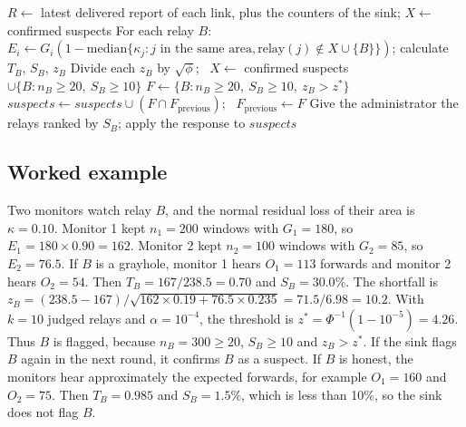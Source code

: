 \documentclass[11pt]{article}
\begin{document}
\begin{algorithm}[H]
\caption{Decision at the sink, every 30 minutes}\label{alg:sink}
\footnotesize
\begin{algorithmic}[1]
\State $R \gets$ latest delivered report of each link, plus the counters of the sink; $X \gets$ confirmed suspects
\Repeat {}
  \State For each relay $B$: $E_i \gets G_i(1-\mathrm{median}\{\kappa_j : j \text{ in the same area}, \mathrm{relay}(j) \notin X \cup \{B\}\})$; calculate $T_B$, $S_B$, $z_B$
  \State Divide each $z_B$ by $\sqrt{\phi}$; \ $X \gets$ confirmed suspects $\cup \{B : n_B \geq 20,\ S_B \geq 10\}$
\State $F \gets \{B : n_B \geq 20,\ S_B \geq 10,\ z_B > z^*\}$
\State $\mathit{suspects} \gets \mathit{suspects} \cup (F \cap F_{\mathrm{previous}})$; \ $F_{\mathrm{previous}} \gets F$
\State Give the administrator the relays ranked by $S_B$; apply the response to $\mathit{suspects}$
\end{algorithmic}
\end{algorithm}

\subsection{Worked example}\label{sec:prop-example}
\noindent
Two monitors watch relay $B$, and the normal residual loss of their area is $\kappa = 0.10$.
Monitor 1 kept $n_1 = 200$ windows with $G_1 = 180$, so $E_1 = 180 \times 0.90 = 162$.
Monitor 2 kept $n_2 = 100$ windows with $G_2 = 85$, so $E_2 = 76.5$.
If $B$ is a grayhole, monitor 1 hears $O_1 = 113$ forwards and monitor 2 hears $O_2 = 54$.
Then $T_B = 167/238.5 = 0.70$ and $S_B = 30.0\%$.
The shortfall is $z_B = (238.5 - 167)/\sqrt{162 \times 0.19 + 76.5 \times 0.235} = 71.5/6.98 = 10.2$.
With $k = 10$ judged relays and $\alpha = 10^{-4}$, the threshold is $z^* = \Phi^{-1}(1 - 10^{-5}) = 4.26$.
Thus $B$ is flagged, because $n_B = 300 \geq 20$, $S_B \geq 10$ and $z_B > z^*$.
If the sink flags $B$ again in the next round, it confirms $B$ as a suspect.
If $B$ is honest, the monitors hear approximately the expected forwards, for example $O_1 = 160$ and $O_2 = 75$.
Then $T_B = 0.985$ and $S_B = 1.5\%$, which is less than 10\%, so the sink does not flag $B$.
\end{document}
